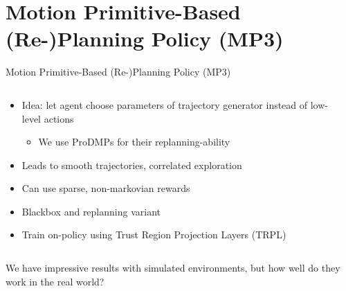 \documentclass[16:9,en,navbarinfooter]{sdqbeamer}
\begin{document}
\section{Motion Primitive-Based (Re-)Planning Policy (MP3)}
\begin{frame}{Motion Primitive-Based (Re-)Planning Policy (MP3)}

\begin{columns}[t]
    \begin{column}{\textwidth}
        \begin{itemize}
            \item Idea: let agent choose parameters of trajectory generator instead of low-level actions
                \begin{itemize}
                    \item We use ProDMPs for their replanning-ability
                \end{itemize}
            \item Leads to smooth trajectories, correlated exploration
            \item Can use sparse, non-markovian rewards
            \item Blackbox and replanning variant
            \item Train on-policy using Trust Region Projection Layers (TRPL)
        \end{itemize}
    \end{column}
    \begin{column}{0.5\textwidth}
    \end{column}
\end{columns}
\vspace{1cm}
     We have impressive results with simulated environments, but how well do they work in the real world?
\end{frame}
\end{document}
